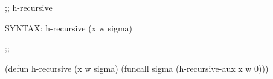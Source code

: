 \begin{aibox}{\function}
;; h-recursive

SYNTAX: h-recursive (x w sigma) 
\end{aibox}

\begin{aibox}{\examples}

\end{aibox}

\begin{aibox}{\comments}

\end{aibox}
\begin{aibox}{\answers}

\end{aibox}
\begin{aibox}{\othercomments}

\end{aibox}
\begin{aibox}{\pseudocode}

\end{aibox}
\begin{aibox}{\code}

;;%

(defun h-recursive (x w sigma) 
		(funcall sigma (h-recursive-aux x w 0)))

\end{aibox}
